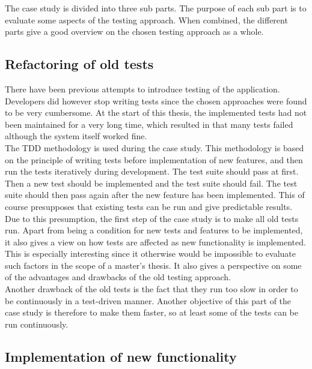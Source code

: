 
The case study is divided into three sub parts. The purpose of each sub
part is to evaluate some aspects of the testing approach. When combined,
the different parts give a good overview on the chosen testing approach
as a whole.\\


\subsection{Refactoring of old tests}
\label{sec:casestudy_1}

There have been previous attempts to introduce testing of the
application. Developers did however stop writing tests since the chosen
approaches were found to be very cumbersome. At the start of this
thesis, the implemented tests had not been maintained for a very long
time, which resulted in that many tests failed although the system
itself worked fine.\\

The TDD methodology is used during the case study. This methodology is
based on the principle of writing tests before implementation of new
features, and then run the tests iteratively during development. The
test suite should pass at first. Then a new test should be implemented
and the test suite should fail. The test suite should then pass again
after the new feature has been implemented. This of course presupposes
that existing tests can be run and give predictable results.\\

Due to this presumption, the first step of the case study is to make all
old tests run. Apart from being a condition for new tests and features
to be implemented, it also gives a view on how tests are affected as new
functionality is implemented. This is especially interesting since it
otherwise would be impossible to evaluate such factors in the scope of a
master's thesis. It also gives a perspective on some of the advantages
and drawbacks of the old testing approach.\\

Another drawback of the old tests is the fact that they run too slow in
order to be continuously in a test-driven manner. Another objective of
this part of the case study is therefore to make them faster, so at
least some of the tests can be run continuously.\\


\subsection{Implementation of new functionality}
\label{sec:casestudy_2}

